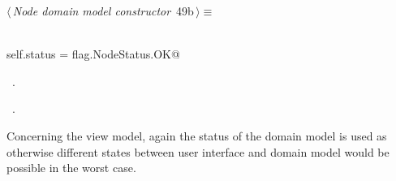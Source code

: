\documentclass[
    a4paper,      %
    10pt,         %
    openright,    %
    notitlepage,  %
    parskip=half, %
]{scrreprt}       %
\theoremstyle{definition}                    %
\begin{document}
\begin{flushleft} \small
\begin{minipage}{\linewidth}\label{scrap67}\raggedright\small
{} $\langle\,${\itshape Node domain model constructor}\nobreak\ {\footnotesize {49b}}$\,\rangle\equiv$
\vspace{-1exm}
\begin{list}{}{} \item
\mbox{}\lstinline@@\\
\mbox{}\lstinline@    self.status = flag.NodeStatus.OK@\\
\mbox{}\lstinline@@{\NWsep}
\end{list}
\vspace{-1.5ex}
\footnotesize
\begin{list}{}{\setlength{\itemsep}{-\parsep}\setlength{\itemindent}{-\leftmargin}}
\item \NWtxtMacroDefBy\ .
\item \NWtxtMacroRefIn\ .

\item{}
\end{list}
\end{minipage}\vspace{4ex}
\end{flushleft}
Concerning the view model, again the status of the domain model is used as
otherwise different states between user interface and domain model would be
possible in the worst case.
\end{document}
